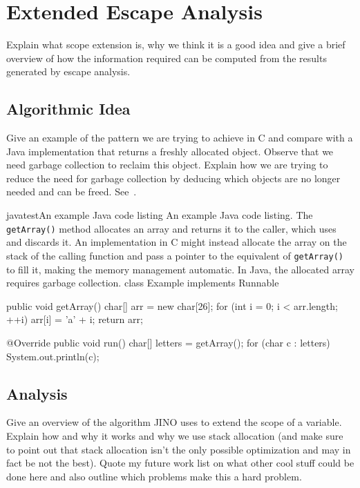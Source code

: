 
\chapter{Extended Escape Analysis}
	\label{chapter:eea}
	Explain what scope extension is, why we think it is a good idea and give a brief overview of how the information
	required can be computed from the results generated by escape analysis.

	\section{Algorithmic Idea}
		\label{sec:eea:idea}
		Give an example of the pattern we are trying to achieve in C and compare with a Java implementation that returns
		a freshly allocated object. Observe that we need garbage collection to reclaim this object. Explain how we are
		trying to reduce the need for garbage collection by deducing which objects are no longer needed and can be freed.
		See~.

		\begin{thesiscode}[gobble=4]{java}{test}{An example Java code listing}{%
				An example Java code listing. The \texttt{getArray()} method allocates an array and returns it to the caller,
				which uses and discards it. An implementation in C might instead allocate the array on the stack of the calling
				function and pass a pointer to the equivalent of \texttt{getArray()} to fill it, making the memory management
				automatic. In Java, the allocated array requires garbage collection.
			}
				class Example implements Runnable {
					public void getArray() {
						char[] arr = new char[26];
						for (int i = 0; i < arr.length; ++i) {
							arr[i] = 'a' + i;
						}
						return arr;
					}

					@Override
					public void run() {
						char[] letters = getArray();
						for (char c : letters) {
							System.out.println(c);
						}
					}
				}\end{thesiscode}

	\section{Analysis}
		\label{sec:eea:analysis}
		Give an overview of the algorithm JINO uses to extend the scope of a variable. Explain how and why it works and why
		we use stack allocation (and make sure to point out that stack allocation isn't the only possible optimization and
		may in fact be not the best). Quote my future work list on what other cool stuff could be done here and also outline
		which problems make this a hard problem.

